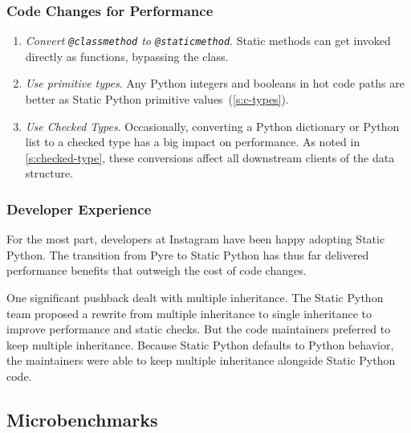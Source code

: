 \documentclass[english,cleveref,submission]{programming}
\newcommand{\SP}{Static Python}
\newcommand{\code}[1]{\texttt{#1}}
\newcommand{\ipara}[1]{\emph{#1}\/.}
\begin{document}
\subsubsection{Code Changes for Performance}

\begin{enumerate}
  \item
    \ipara{Convert \code{@classmethod} to \code{@staticmethod}}
    Static methods can get invoked directly as functions, bypassing the class.

  \item
    \ipara{Use primitive types}
    Any Python integers and booleans in hot code paths are better as
    \SP{} primitive values~(\cref{s:c-types}).

  \item
    \ipara{Use Checked Types}
    Occasionally, converting a Python dictionary or Python list to a
    checked type has a big impact on performance.
    As noted in \cref{s:checked-type}, these conversions affect all downstream
    clients of the data structure.

\end{enumerate}


\subsubsection{Developer Experience}

For the most part, developers at Instagram have been happy adopting \SP{}.
The transition from Pyre to \SP{} has thus far delivered performance benefits
that outweigh the cost of code changes.

One significant pushback dealt with multiple inheritance.
The \SP{} team proposed a rewrite from multiple inheritance to single inheritance
to improve performance and static checks.
But the code maintainers preferred to keep multiple inheritance.
Because \SP{} defaults to Python behavior, the maintainers were able
to keep multiple inheritance alongside \SP{} code.



\subsection{Microbenchmarks}
\end{document}
